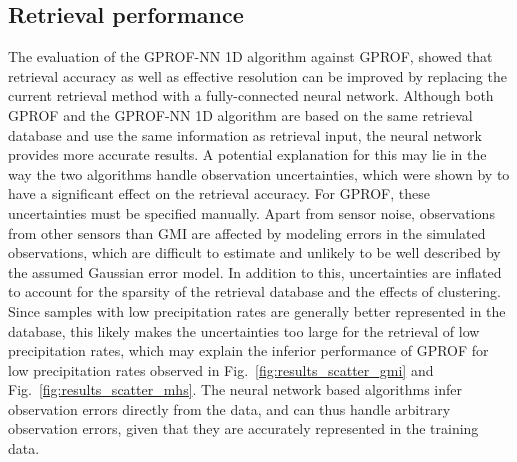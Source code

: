 \documentclass[journal abbreviation, manuscript]{copernicus}
\begin{document}
\subsection{Retrieval performance}

The evaluation of the GPROF-NN 1D algorithm against GPROF, showed that retrieval
accuracy as well as effective resolution can be improved by replacing the
current retrieval method with a fully-connected neural network. Although both
GPROF and the GPROF-NN 1D algorithm are based on the same retrieval database and
use the same information as retrieval input, the neural network provides more
accurate results. A potential explanation for this may lie in the way the two
algorithms handle observation uncertainties, which were shown by
\citet{elsaesser15} to have a significant effect on the retrieval accuracy. For
GPROF, these uncertainties must be specified manually. Apart from sensor noise,
observations from other sensors than GMI are affected by modeling errors in the
simulated observations, which are difficult to estimate and unlikely to be well
described by the assumed Gaussian error model. In addition to this,
uncertainties are inflated to account for the sparsity of the retrieval database
and the effects of clustering. Since samples with low precipitation rates are
generally better represented in the database, this likely makes the
uncertainties too large for the retrieval of low precipitation rates, which may
explain the inferior performance of GPROF for low precipitation rates observed
in Fig.~\ref{fig:results_scatter_gmi} and Fig.~\ref{fig:results_scatter_mhs}.
The neural network based algorithms infer observation errors directly from the
data, and can thus handle arbitrary observation errors, given that they are
accurately represented in the training data.

\end{document}
